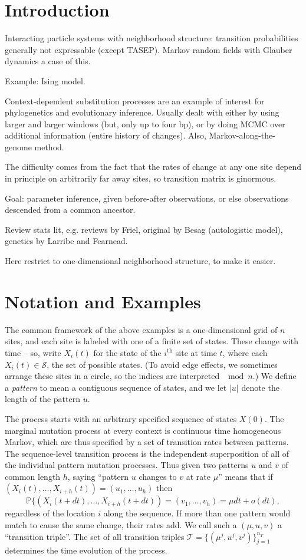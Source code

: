\documentclass{article}
\renewcommand{\P}{\mathbb{P}}
\newcommand{\calS}{\mathcal{S}}  %
\newcommand{\calT}{\mathcal{T}}  %
\theoremstyle{plain}
\theoremstyle{definition}
\begin{document}
\section*{Introduction}

Interacting particle systems with neighborhood structure: transition probabilities generally not expressable (except TASEP).
Markov random fields with Glauber dynamics a case of this.

Example: Ising model.

Context-dependent substitution processes are an example of interest for phylogenetics and evolutionary inference.
Usually dealt with either by using larger and larger windows (but, only up to four bp),
or by doing MCMC over additional information (entire history of changes).
Also, Markov-along-the-genome method.

The difficulty comes from the fact that the rates of change at any one site depend in principle on arbitrarily far away sites,
so transition matrix is ginormous.

Goal: parameter inference, given before-after observations, or else observations descended from a common ancestor.

Review stats lit, e.g. reviews by Friel, original by Besag (autologistic model), genetics by Larribe and Fearnead.

Here restrict to one-dimensional neighborhood structure,
to make it easier.

\section{Notation and Examples}

The common framework of the above examples is a one-dimensional grid of $n$ sites,
and each site is labeled with one of a finite set of states.
These change with time -- so, write $X_i(t)$ for the state of the $i^\mathrm{th}$ site at time $t$,
where each $X_i(t) \in \calS$, the set of possible states.
(To avoid edge effects, we sometimes arrange these sites in a circle, so the indices are interpreted $\mod n$.)
We define a \textit{pattern} to mean a contiguous sequence of states, and we let $|u|$ denote the length of the pattern $u$.

The process starts with an arbitrary specified sequence of states $X(0)$.
The marginal mutation process at every context is continuous time homogeneous Markov, which are thus specified by a set of transition rates between patterns.
The sequence-level transition process is the independent superposition of all of the individual pattern mutation processes.
Thus given two patterns $u$ and $v$ of common length $h$, saying ``pattern $u$ changes to $v$ at rate $\mu$'' means that if $(X_i(t), \ldots, X_{i+h}(t)) = (u_1, \ldots, u_h)$ then
\[
\P\{(X_i(t+dt), \ldots, X_{i+h}(t+dt)) = (v_1, \ldots, v_h) = \mu dt + o(dt),
\]
regardless of the location $i$ along the sequence.
If more than one pattern would match to cause the same change, their rates add.
We call such a $(\mu,u,v)$ a ``transition triple''.
The set of all transition triples $\calT = \{ (\mu^j,u^j,v^j) \}_{j=1}^{n_T}$
determines the time evolution of the process.
\end{document}
